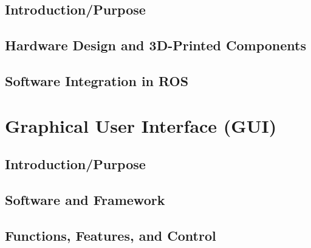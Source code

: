 \subsection{Introduction/Purpose}
\subsection{Hardware Design and 3D-Printed Components}
\subsection{Software Integration in ROS}

\section{Graphical User Interface (GUI)}
\subsection{Introduction/Purpose}
\subsection{Software and Framework}
\subsection{Functions, Features, and Control}
